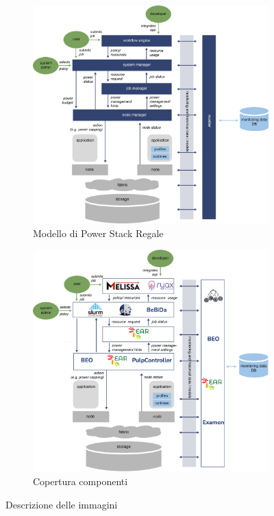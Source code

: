 \begin{figure}[htbp][H]
    \centering
    \begin{subfigure}[b]{0.7\textwidth}
    \includegraphics[width=\textwidth]{img/REGALE-Architecture-1536x1421.png}
    \caption{Modello di Power Stack Regale}\label{fig:powerstackscheme}
    \end{subfigure}
    \hfill
    \begin{subfigure}[b]{0.7\textwidth}
    \includegraphics[width=\textwidth]{img/REGALE_USE.png}
    \caption{Copertura componenti}\label{fig:regale_cover}
    \end{subfigure}
    \caption{Descrizione delle immagini}
\end{figure}

